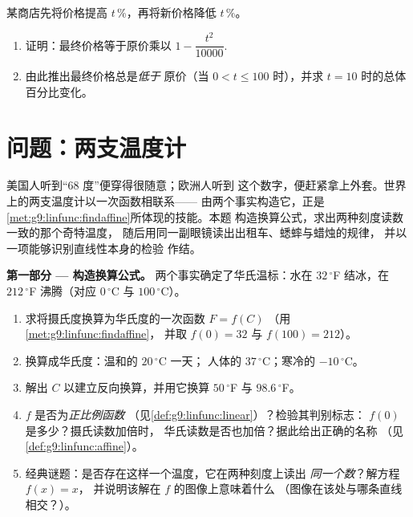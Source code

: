 \begin{exercise}[$\star\star\star$]\label{exo:g9:linfunc:10}
某商店先将价格提高 $t\,\%$，再将新价格降低
$t\,\%$。
\begin{enumerate}
  \item 证明：最终价格等于原价乘以
        $1 - \dfrac{t^2}{10000}$.
  \item 由此推出最终价格总是\emph{低于}
        原价（当 $0 < t \leq 100$ 时），并求
        $t = 10$ 时的总体百分比变化。
\end{enumerate}
\end{exercise}

\section{问题：两支温度计}

\begin{problem}
\label{pb:g9:linfunc:1}
美国人听到“$68$ 度”便穿得很随意；欧洲人听到
这个数字，便赶紧拿上外套。世界上的两支温度计以一次函数相联系——
由两个事实构造它，正是
\cref{met:g9:linfunc:findaffine}所体现的技能。本题
构造换算公式，求出两种刻度读数一致的那个奇特温度，
随后用同一副眼镜读出出租车、蟋蟀与蜡烛的规律，
并以一项能够识别直线性本身的检验
作结。

\medskip
\noindent\textbf{第一部分 --- 构造换算公式。}
两个事实确定了华氏温标：水在
$32\,^\circ$F 结冰，在 $212\,^\circ$F 沸腾（对应 $0\,^\circ$C 与
$100\,^\circ$C）。
\begin{enumerate}
  \item 求将摄氏度换算为华氏度的一次函数 $F = f(C)$
        （用\cref{met:g9:linfunc:findaffine}，
        并取 $f(0) = 32$ 与 $f(100) = 212$）。
  \item 换算成华氏度：温和的 $20\,^\circ$C 一天；
        人体的 $37\,^\circ$C；寒冷的 $-10\,^\circ$C。
  \item 解出 $C$ 以建立反向换算，并用它换算
        $50\,^\circ$F 与 $98.6\,^\circ$F。
  \item $f$ 是否为\emph{正比例函数}
        （见\cref{def:g9:linfunc:linear}）？检验其判别标志：
        $f(0)$ 是多少？摄氏读数加倍时，
        华氏读数是否也加倍？据此给出正确的名称
        （见\cref{def:g9:linfunc:affine}）。
  \item 经典谜题：是否存在这样一个温度，它在两种刻度上读出
        \emph{同一个数}？解方程 $f(x) = x$，
        并说明该解在 $f$ 的图像上意味着什么
        （图像在该处与哪条直线相交？）。
\end{enumerate}


\end{problem}
